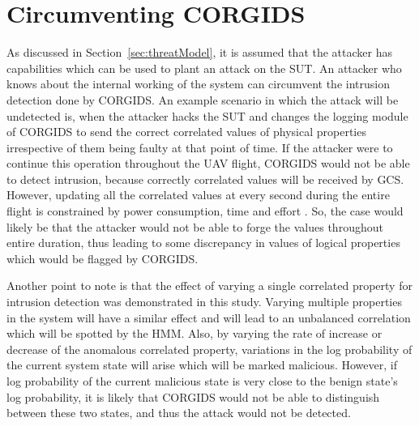 \section{Circumventing \ac{CORGIDS}}
As discussed in Section~\ref{sec:threatModel}, it is assumed that the attacker has capabilities which can be used to plant an attack on the \ac{SUT}. An attacker who knows about the internal working of the system can circumvent the intrusion detection done by \ac{CORGIDS}. An example scenario in which the attack will be undetected is, when the attacker hacks the \ac{SUT} and changes the logging module of \ac{CORGIDS} to send the correct correlated values of physical properties irrespective of them being faulty at that point of time. If the attacker were to continue this operation throughout the \ac{UAV} flight, \ac{CORGIDS} would not be able to detect intrusion, because correctly correlated values will be received by \ac{GCS}. However, updating all the correlated values at every second during the entire flight is constrained by power consumption, time and effort \cite{krotofil2015process}. So, the case would likely be that the attacker would  not be able to forge the values throughout entire duration, thus leading to some discrepancy in values of logical properties which would be flagged by \ac{CORGIDS}. 

Another point to note is that the effect of varying a single correlated property for intrusion detection was demonstrated in this study. Varying multiple properties in the system will have a similar effect and will lead to an unbalanced correlation which will be spotted by the \ac{HMM}. Also, by varying the rate of increase or decrease of the anomalous correlated property, variations in the log probability of the current system state will arise which will be marked malicious. However, if log probability of the current malicious state is very close to the benign state's log probability, it is likely that \ac{CORGIDS} would not be able to distinguish between these two states, and thus the attack would not be detected.
\endinput
=====================================================================


